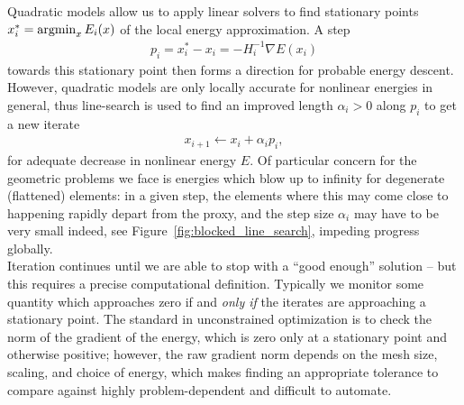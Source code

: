  Quadratic models allow us to apply linear solvers
to find stationary points $x_i^* = \mathop{\rm argmin}_x E_i(x)$ of the local
energy approximation. A step
\begin{align}
\label{eq:descent_step_solve}
p_i = x_i^* - x_i = -H_i ^{-1} \nabla E(x_i) 
\end{align}
towards this stationary point then forms a direction for probable energy descent.
However, quadratic models are only locally accurate for nonlinear energies in general,
thus line-search is used to find an improved length $\alpha_i>0$ along $p_i$ to get a new iterate 
\begin{align}
\label{eq:vanilla_step}
x_{i+1} \leftarrow x_i + \alpha_i p_i,
\end{align}
for adequate decrease in nonlinear energy $E$. Of particular concern for
the geometric problems we face is energies which blow up to infinity for
degenerate (flattened) elements: in a given step, the elements where this
may come close to happening rapidly depart from the proxy, and the step size $\alpha_i$ may
have to be very small indeed, see Figure\ \ref{fig:blocked_line_search}, impeding progress globally. \\

 Iteration continues until we are able to stop with
a ``good enough'' solution -- but this requires a precise computational
definition. Typically we monitor some quantity which approaches zero
if and \emph{only if} the iterates are approaching a stationary point.
The standard in unconstrained optimization is to check the norm of the
gradient of the energy, which is zero only at a stationary point and
otherwise positive; however, the raw gradient norm depends on the mesh
size, scaling, and choice of energy, which makes finding an appropriate
tolerance to compare against highly problem-dependent and difficult
to automate. \\

